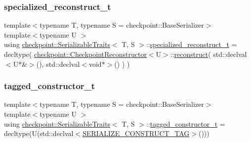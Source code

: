 \mbox{\label{structcheckpoint_1_1_serializable_traits_a914c73251ad840e5370f1ac7cb1c18de}} 
\subsubsection{\texorpdfstring{specialized\+\_\+reconstruct\+\_\+t}{specialized\_reconstruct\_t}}
{\footnotesize\ttfamily template$<$typename T, typename S = checkpoint\+::\+Base\+Serializer$>$ \\
template$<$typename U $>$ \\
using \hyperlink{structcheckpoint_1_1_serializable_traits}{checkpoint\+::\+Serializable\+Traits}$<$ T, S $>$\+::\hyperlink{structcheckpoint_1_1_serializable_traits_a914c73251ad840e5370f1ac7cb1c18de}{specialized\+\_\+reconstruct\+\_\+t} =  decltype( \hyperlink{structcheckpoint_1_1_checkpoint_reconstructor}{checkpoint\+::\+Checkpoint\+Reconstructor}$<$U$>$\+::\hyperlink{namespacecheckpoint_a6254f2e220f905a2b0c797c08092a7a1}{reconstruct}( std\+::declval$<$U$\ast$\&$>$(), std\+::declval$<$void$\ast$$>$() ) )}

\mbox{\label{structcheckpoint_1_1_serializable_traits_a5a1f289a5008468335f22e288a96d861}} 
\subsubsection{\texorpdfstring{tagged\+\_\+constructor\+\_\+t}{tagged\_constructor\_t}}
{\footnotesize\ttfamily template$<$typename T, typename S = checkpoint\+::\+Base\+Serializer$>$ \\
template$<$typename U $>$ \\
using \hyperlink{structcheckpoint_1_1_serializable_traits}{checkpoint\+::\+Serializable\+Traits}$<$ T, S $>$\+::\hyperlink{structcheckpoint_1_1_serializable_traits_a5a1f289a5008468335f22e288a96d861}{tagged\+\_\+constructor\+\_\+t} =  decltype(U(std\+::declval$<$\hyperlink{namespacecheckpoint_a7ff642cff4d72d01a16ab10e9bc363ef}{S\+E\+R\+I\+A\+L\+I\+Z\+E\+\_\+\+C\+O\+N\+S\+T\+R\+U\+C\+T\+\_\+\+T\+AG}$>$()))}




